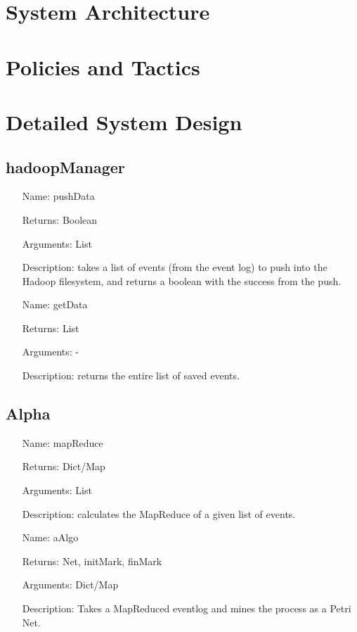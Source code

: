 \documentclass[runningheads]{llncs}
\begin{document}
\section{System Architecture}
\section{Policies and Tactics}
\section{Detailed System Design}
\subsection{hadoopManager}
\begin{itemize}
\item[Name:] pushData
\item[Returns:] Boolean
\item[Arguments:] List
\item[Description:] takes a list of events (from the event log) to push into the Hadoop filesystem, and returns a boolean with the success from the push.
\end{itemize}

\begin{itemize}
\item[Name:] getData
\item[Returns:] List
\item[Arguments:] -
\item[Description:] returns the entire list of saved events.
\end{itemize}

\subsection{Alpha}
\begin{itemize}
\item[Name:] mapReduce
\item[Returns:] Dict/Map
\item[Arguments:] List
\item[Description:] calculates the MapReduce of a given list of events.
\end{itemize}

\begin{itemize}
\item[Name:] aAlgo
\item[Returns:] Net, initMark, finMark
\item[Arguments:] Dict/Map
\item[Description:] Takes a MapReduced eventlog and mines the process as a Petri Net.
\end{itemize}
\end{document}

